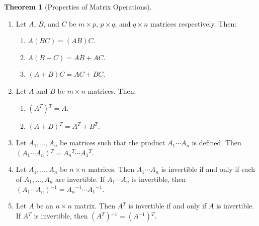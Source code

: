 \documentclass{myart}
\newcommand{\mat}[1]{\ensuremath{#1}}
\newcommand{\by}{\ensuremath{\times}}
\newcommand{\inv}{\ensuremath{^{-1}}}
\newcommand{\trans}{\ensuremath{^T}}
\newcommand{\many}[2][n]{\ensuremath{{#2}_1, \ldots, {#2}_{#1}}}
\theoremstyle{definition}
\newtheorem{thm}{Theorem}
\begin{document}
\begin{thm}[Properties of Matrix Operations] \hfill
  \begin{enumerate}
  \item Let \mat A, \mat B, and \mat C be $m \by p$, $p \by q$, and $q
    \by n$ matrices respectively. Then:
    \begin{enumerate}
    \item $\mat A (\mat B \mat C) = (\mat A \mat B) \mat C$.
    \item $\mat A (\mat B + \mat C) = \mat A \mat B + \mat A \mat C$.
    \item $(\mat A + \mat B) \mat C = \mat A \mat C + \mat B \mat C$.
    \end{enumerate}
  \item Let \mat A and \mat B be $m \by n$ matrices. Then:
    \begin{enumerate}
    \item $(\mat A\trans)\trans = \mat A$.
    \item $(\mat A + \mat B)\trans = \mat A\trans + \mat B\trans$.
    \end{enumerate}
  \item Let \many{\mat A} be matrices such that the product $\mat A_1
    \cdots \mat A_n$ is defined. Then $(\mat A_1 \cdots \mat
    A_n)\trans = \mat A_n\trans \cdots \mat A_1\trans$.
  \item Let \many{\mat A} be $n \by n$ matrices. Then $\mat A_1 \cdots
    \mat A_n$ is invertible if and only if each of \many{\mat A} are
    invertible. If $\mat A_1 \cdots \mat A_n$ is invertible, then
    $(\mat A_1 \cdots \mat A_n)\inv = \mat A_n\inv \cdots \mat
    A_1\inv$.
  \item Let \mat A be an $n \by n$ matrix. Then $\mat A\trans$ is
    invertible if and only if \mat A is invertible. If $\mat A\trans$
    is invertible, then $(\mat A\trans)\inv = (\mat A\inv)\trans$.
  \end{enumerate}
\end{thm}
\end{document}
